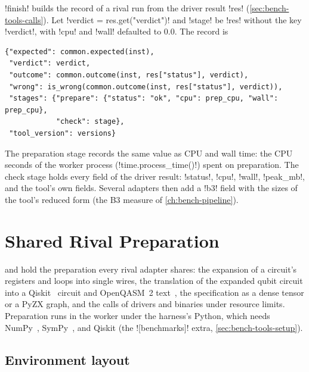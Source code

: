 \py!finish! builds the record of a rival run from the driver result \py!res! (\cref{sec:bench-tools-calls}). Let \py!verdict = res.get("verdict")! and \py!stage! be \py!res! without the key \code!verdict!, with \code!cpu! and \code!wall! defaulted to $0.0$. The record is
\begin{lstlisting}[style=python]
{"expected": common.expected(inst),
 "verdict": verdict,
 "outcome": common.outcome(inst, res["status"], verdict),
 "wrong": is_wrong(common.outcome(inst, res["status"], verdict)),
 "stages": {"prepare": {"status": "ok", "cpu": prep_cpu, "wall": prep_cpu},
            "check": stage},
 "tool_version": versions}
\end{lstlisting}
The preparation stage records the same value as CPU and wall time: the CPU seconds of the worker process (\py!time.process_time()!) spent on preparation. The check stage holds every field of the driver result: \code!status!, \code!cpu!, \code!wall!, \code!peak_mb!, and the tool's own fields. Several adapters then add a \code!b3! field with the sizes of the tool's reduced form (the B3 measure of \cref{ch:bench-pipeline}).

\section{Shared Rival Preparation}\label{sec:bench-tools-prep}

 and  hold the preparation every rival adapter shares: the expansion of a circuit's registers and loops into single wires, the translation of the expanded qubit circuit into a Qiskit~\cite{javadi2024qiskit} circuit and OpenQASM~2 text~\cite{cross2017openqasm}, the specification as a dense tensor or a PyZX graph, and the calls of drivers and binaries under resource limits. Preparation runs in the worker under the harness's Python, which needs NumPy~\cite{harris2020numpy}, SymPy~\cite{meurer2017sympy}, and Qiskit (the \code![benchmarks]! extra, \cref{sec:bench-tools-setup}).

\subsection{Environment layout}\label{sec:bench-tools-layout}


